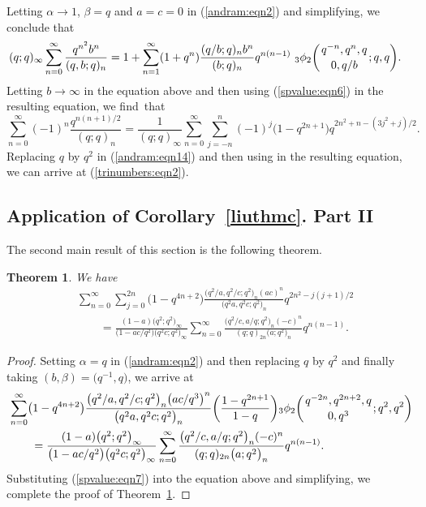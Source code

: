 \documentclass[10pt,a4paper]{amsart}
\numberwithin{equation}{section}
\newtheorem{Theorem}{Theorem}[section]
\begin{document}
Letting $\alpha \to 1$, $\beta=q$ and $a=c=0$ in (\ref{andram:eqn2}) and simplifying, we conclude that
\begin{align}\label{andram:eqn14}
&(q; q)_\infty \sum_{n=0}^{\infty} \frac{q^{n^2} b^n}{(q, b; q)_n}
=1+\sum_{n=1}^{\infty}(1+q^n)\frac{(q/b; q)_n b^n}{(b; q)_n} q^{n(n-1)}~{_3\phi_2}\biggl({{q^{-n}, q^n, q}
		\atop{0, q/b}}; q, q\biggr).
\end{align}
Letting $b\to \infty$ in the equation above and then using (\ref{spvalue:eqn6}) in the resulting equation, we find~that%
\begin{equation*}%
\sum_{n=0}^{\infty} (-1)^n \frac{q^{n(n+1)/2}}{(q; q)_n}
=\frac{1}{(q; q)_\infty}\sum_{n=0}^{\infty}\sum_{j=-n}^{n} (-1)^j \bigl(1-q^{2n+1}\bigr) q^{2n^2+n-(3j^2+j)/2}.
\end{equation*}
Replacing $q$ by $q^2$ in (\ref{andram:eqn14}) and then using \cite[equation~(5.33)]{ChenWang2020} in the resulting equation,
we can arrive at (\ref{trinumbers:eqn2}).

\subsection{Application of Corollary~\ref{liuthmc}. Part II}
The second main result of this section is the following theorem.
\begin{Theorem}\label{andrrthm2} We have
\begin{align*}%
&\sum_{n=0}^\infty \sum_{j=0}^{2n} \bigl(1-q^{4n+2}\bigr)\frac{\bigl(q^2/a, q^2/c; q^2\bigr)_n (ac)^n}{\bigl(q^2 a, q^2c; q^2\bigr)_n} q^{2n^2-j(j+1)/2}\\
&\qquad{}=\frac{(1-a)\bigl(q^2; q^2\bigr)_\infty}{\bigl(1-ac/q^2\bigr)\bigl(q^2 c; q^2\bigr)_\infty}
\sum_{n=0}^\infty \frac{\bigl(q^2/c, a/q; q^2\bigr)_n (-c)^n}{(q; q)_{2n} \bigl(a; q^2\bigr)_n}q^{n(n-1)}.\nonumber
\end{align*}
\end{Theorem}
\begin{proof} Setting $\alpha=q$ in (\ref{andram:eqn2}) and then replacing $q$ by $q^2$ and finally taking $(b, \beta)=\bigl(q^{-1}, q\bigr)$, we arrive at
\begin{align*}%
&\sum_{n=0}^\infty \bigl(1-q^{4n+2}\bigr) \frac{\bigl(q^2/a, q^2/c; q^2\bigr)_n \bigl(ac/q^3\bigr)^n}{\bigl(q^2 a, q^2 c; q^2\bigr)_n}
 \biggl(\frac{1-q^{2n+1}}{1-q}\biggr)
{_3\phi_2}\biggl({{q^{-2n}, q^{2n+2}, q} \atop{0, q^3}}; q^2, q^2\biggr)\nonumber\\
&\qquad{}=\frac{(1-a)\bigl(q^2; q^2\bigr)_\infty}{\bigl(1-ac/q^2\bigr)\bigl(q^2 c; q^2\bigr)_\infty}
\sum_{n=0}^\infty \frac{\bigl(q^2/c, a/q; q^2\bigr)_n (-c)^n}{(q; q)_{2n} \bigl(a; q^2\bigr)_n} q^{n(n-1)}.
\end{align*}	
Substituting (\ref{spvalue:eqn7})	into the equation above and simplifying, we complete the proof of Theorem~\ref{andrrthm2}.
\end{proof}
\end{document}
